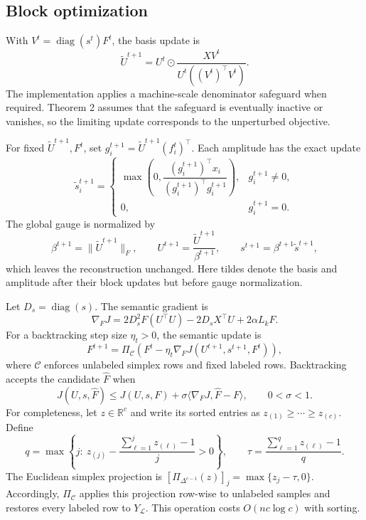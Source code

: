 \documentclass[a4paper,preprint,12pt]{elsarticle}
\theoremstyle{remark}
\begin{document}
\subsection{Block optimization}

With \(V^t=\operatorname{diag}(s^t)F^t\), the basis update is
\begin{equation}
\label{eq:update_u}
\widetilde U^{t+1}=U^t\odot
\frac{XV^t}{U^t((V^t)^\top V^t)}.
\end{equation}
The implementation applies a machine-scale denominator safeguard when required. Theorem 2 assumes that the safeguard is eventually inactive or vanishes, so the limiting update corresponds to the unperturbed objective.

For fixed \(\widetilde U^{t+1},F^t\), set \(g_i^{t+1}=\widetilde U^{t+1}(f_i^t)^\top\). Each amplitude has the exact update
\begin{equation}
\label{eq:update_s}
\widetilde s_i^{t+1}=
\begin{cases}
\max\!\left(0,\dfrac{(g_i^{t+1})^\top x_i}{(g_i^{t+1})^\top g_i^{t+1}}\right),&g_i^{t+1}\ne0,\\
0,&g_i^{t+1}=0.
\end{cases}
\end{equation}
The global gauge is normalized by
\begin{equation}
\label{eq:update_gauge}
\beta^{t+1}=\lVert\widetilde U^{t+1}\rVert_F,\qquad
U^{t+1}=\frac{\widetilde U^{t+1}}{\beta^{t+1}},\qquad
s^{t+1}=\beta^{t+1}\widetilde s^{t+1},
\end{equation}
which leaves the reconstruction unchanged. Here tildes denote the basis and amplitude after their block updates but before gauge normalization.

Let \(D_s=\operatorname{diag}(s)\). The semantic gradient is
\begin{equation}
\label{eq:gradient_f}
\nabla_FJ=2D_s^2F(U^\top U)-2D_sX^\top U+2\alpha L_kF.
\end{equation}
For a backtracking step size \(\eta_t>0\), the semantic update is
\begin{equation}
\label{eq:update_f}
F^{t+1}=\Pi_{\mathcal C}\!\left(F^t-\eta_t\nabla_FJ(U^{t+1},s^{t+1},F^t)\right),
\end{equation}
where \(\mathcal C\) enforces unlabeled simplex rows and fixed labeled rows. Backtracking accepts the candidate \(\widehat F\) when
\begin{equation}
\label{eq:armijo}
J(U,s,\widehat F)\le J(U,s,F)
+\sigma\langle\nabla_FJ,\widehat F-F\rangle,
\qquad 0<\sigma<1.
\end{equation}
For completeness, let \(z\in\mathbb R^c\) and write its sorted entries as \(z_{(1)}\ge\cdots\ge z_{(c)}\). Define
\begin{equation}
\label{eq:simplex_projection}
q=\max\left\{j:\ z_{(j)}-\frac{\sum_{\ell=1}^{j}z_{(\ell)}-1}{j}>0\right\},\qquad
\tau=\frac{\sum_{\ell=1}^{q}z_{(\ell)}-1}{q}.
\end{equation}
The Euclidean simplex projection is \([\Pi_{\Delta^{c-1}}(z)]_j=\max\{z_j-\tau,0\}\). Accordingly, \(\Pi_{\mathcal C}\) applies this projection row-wise to unlabeled samples and restores every labeled row to \(Y_{\mathcal L}\). This operation costs \(O(nc\log c)\) with sorting.
\end{document}
